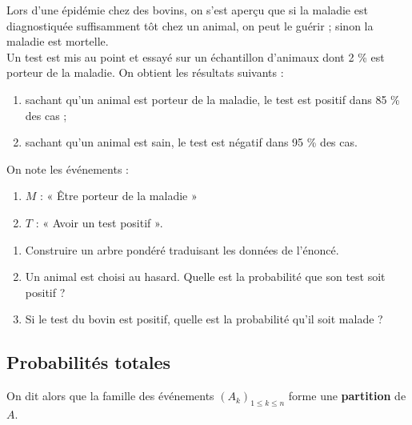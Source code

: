 \documentclass[a4paper,11pt,cours]{nsi} %
\begin{document}
\begin{exercice}
	Lors d’une épidémie chez des bovins, on s’est aperçu que si la maladie est
	diagnostiquée suffisamment tôt chez un animal, on peut le guérir ; sinon la maladie
	est mortelle.\\
	Un test est mis au point et essayé sur un échantillon d’animaux dont 2 \% est porteur
	de la maladie.
	On obtient les résultats suivants :
	\begin{enumerate}[label=\textbullet]
		\item 	sachant qu’un animal est porteur de la maladie, le test est positif dans 85 \% des
		cas ;
		\item 	sachant qu’un animal est sain, le test est négatif dans 95 \% des cas.	
	\end{enumerate}
	On note les événements :
	\begin{enumerate}[label=\textbullet]
		\item 	$M$ : « Être porteur de la maladie »
		\item 	$T$ : « Avoir un test positif ».
	\end{enumerate}

\begin{enumerate}
	\item 	Construire un arbre pondéré traduisant les données de l'énoncé.
	\item 	Un animal est choisi au hasard. Quelle est la probabilité que son test soit positif ?
	\item	Si le test du bovin est positif, quelle est la probabilité qu'il soit malade ?
\end{enumerate}
\end{exercice}

\subsection{Probabilités totales}
\begin{definition}[ ]

	On dit alors que la famille des événements $\left(A_k\right)_{1\leqslant k \leqslant n}$ forme une \textbf{partition} de $A$.
	
\end{definition}
\end{document}
